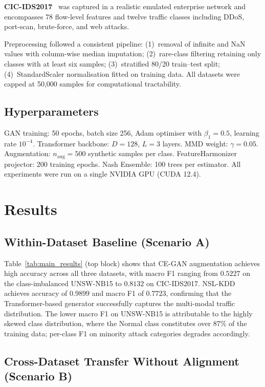 \documentclass[conference]{IEEEtran}
\begin{document}
\textbf{CIC-IDS2017}~\cite{sharafaldin2018toward} was captured in a
realistic emulated enterprise network and encompasses 78 flow-level features
and twelve traffic classes including DDoS, port-scan, brute-force, and
web attacks.

Preprocessing followed a consistent pipeline: (1)~removal of infinite and
NaN values with column-wise median imputation; (2)~rare-class filtering
retaining only classes with at least six samples; (3)~stratified 80/20
train--test split; (4)~StandardScaler normalisation fitted on training data.
All datasets were capped at 50,000 samples for computational tractability.

\subsection{Hyperparameters}

GAN training: 50 epochs, batch size 256, Adam optimiser with
$\beta_1=0.5$, learning rate $10^{-4}$.
Transformer backbone: $D=128$, $L=3$ layers.
MMD weight: $\gamma=0.05$.
Augmentation: $n_{\text{aug}}=500$ synthetic samples per class.
FeatureHarmonizer projector: 200 training epochs.
Nash Ensemble: 100 trees per estimator.
All experiments were run on a single NVIDIA GPU (CUDA 12.4).

\section{Results}

\subsection{Within-Dataset Baseline (Scenario A)}

Table~\ref{tab:main_results} (top block) shows that CE-GAN augmentation
achieves high accuracy across all three datasets, with macro F1 ranging
from $0.5227$ on the class-imbalanced UNSW-NB15 to $0.8132$ on CIC-IDS2017.
NSL-KDD achieves accuracy of $0.9899$ and macro F1 of $0.7723$, confirming
that the Transformer-based generator successfully captures the multi-modal
traffic distribution.
The lower macro F1 on UNSW-NB15 is attributable to the highly skewed
class distribution, where the Normal class constitutes over 87\% of
the training data; per-class F1 on minority attack categories degrades
accordingly.

\subsection{Cross-Dataset Transfer Without Alignment (Scenario B)}
\end{document}
